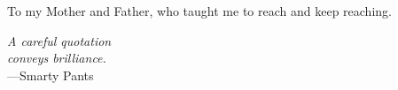 %
\begin{frontmatter}

%
%
\makefrontmatter

%
%
%
%
%
%
\begin{dedication}
  To my Mother and Father, who taught me to reach and keep reaching.
\end{dedication}


%
%



%
%
\begin{epigraph} %
  \emph{A careful quotation\\
  conveys brilliance.}\\
  ---Smarty Pants
\end{epigraph}

%



\end{frontmatter}
